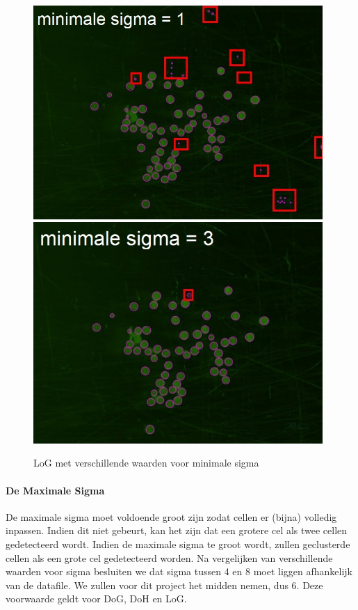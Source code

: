 \documentclass{article}
\begin{document}
\begin{multicols}{2}
\begin{figure}[H]
\centering
\includegraphics[width=0.98\textwidth]{images/log_spook.jpg}
\includegraphics[width=0.98\textwidth]{images/log_geen_spook.jpg}
\caption{\label{fig:spook}LoG met verschillende waarden voor minimale sigma}
\end{figure}


\paragraph{De Maximale Sigma}
\label{sub:max_sigma}
De maximale sigma moet voldoende groot zijn zodat cellen er (bijna) volledig inpassen. Indien dit niet gebeurt, kan het zijn dat een grotere cel als twee cellen gedetecteerd wordt. Indien de maximale sigma te groot wordt, zullen geclusterde cellen als een grote cel gedetecteerd worden. Na vergelijken van verschillende waarden voor sigma besluiten we dat sigma tussen 4 en 8 moet liggen afhankelijk van de datafile. We zullen voor dit project het midden nemen, dus 6. Deze voorwaarde geldt voor DoG, DoH en LoG.


\end{multicols}
\end{document}

